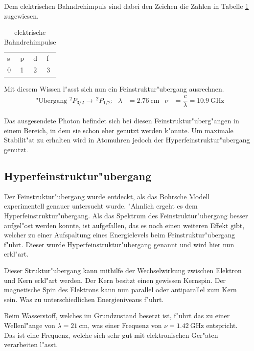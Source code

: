\begin{refsection}
Dem elektrischen Bahndrehimpuls sind dabei den Zeichen die Zahlen in
Tabelle \ref{atomuhr:drehimpulsnotation} zugewiesen.

\begin{table}
	\centering	
	\begin{tabular}{llll}
		s & p & d & f \\
		0 & 1 & 2 & 3 \\
	\end{tabular}
	\caption{elektrische Bahndrehimpulse}
	\label{atomuhr:drehimpulsnotation}
\end{table}

Mit diesem Wissen l"asst sich nun ein Feinstruktur"ubergang ausrechnen. 
\begin{align*}
  &\text{"Ubergang \(^2P_{3/2} \rightarrow\,^2P_{1/2}\):} &\lambda &=
  \SI{2.76}{\centi\meter} &\nu &= \dfrac{c}{\lambda} =
  \SI{10.9}{\giga\hertz}
\end{align*}

Das ausgesendete Photon befindet sich bei diesen
Feinstruktur"uberg"angen in einem Bereich, in dem sie schon eher
genutzt werden k"onnte.  Um maximale Stabilit"at zu erhalten wird in
Atomuhren jedoch der Hyperfeinstruktur"ubergang genutzt.

\subsection{Hyperfeinstruktur"ubergang}
\label{sec:hyperf}
Der Feinstruktur"ubergang wurde entdeckt, als das Bohrsche Modell
experimentell genauer untersucht wurde. "Ahnlich ergeht es dem
Hyperfeinstruktur"ubergang. Als das Spektrum des Feinstruktur"ubergang
besser aufgel"ost werden konnte, ist aufgefallen, das es noch einen
weiteren Effekt gibt, welcher zu einer Aufspaltung eines Energielevels
beim Feinstruktur"ubergang f"uhrt. Dieser wurde
Hyperfeinstruktur"ubergang genannt und wird hier nun erkl"art.

Dieser Struktur"ubergang kann mithilfe der Wechselwirkung zwischen
Elektron und Kern erkl"art werden. Der Kern besitzt einen gewissen
Kernspin. Der magnetische Spin des Elektrons kann nun parallel oder
antiparallel zum Kern sein. Was zu unterschiedlichen Energieniveaus
f"uhrt.

Beim Wasserstoff, welches im Grundzustand besetzt ist, f"uhrt das zu
einer Wellenl"ange von $\lambda = \SI{21}{\centi\meter}$, was einer
Frequenz von $\nu = \SI{1.42}{\giga\hertz}$ entspricht. Das ist eine
Frequenz, welche sich sehr gut mit elektronischen Ger"aten verarbeiten
l"asst.


\end{refsection}
